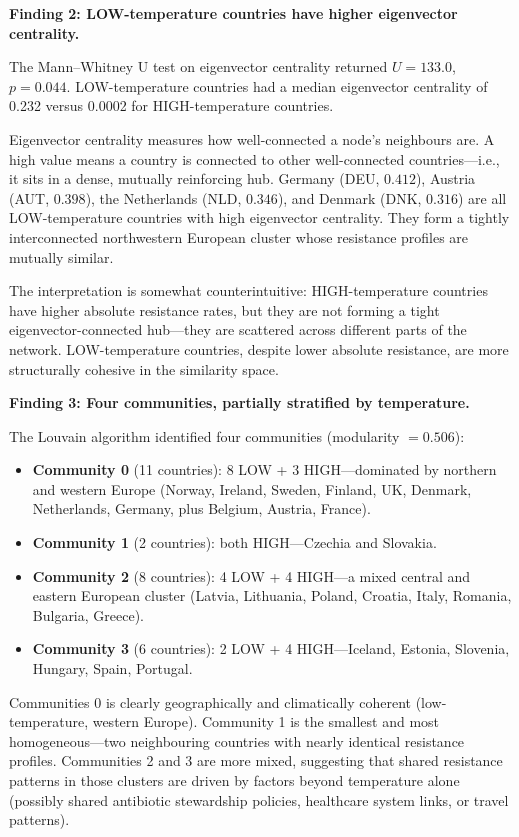 \documentclass[12pt,a4paper]{article}
\begin{document}
\textbf{Finding 2: LOW-temperature countries have higher eigenvector
centrality.}

The Mann--Whitney U test on eigenvector centrality returned
$U = 133.0$, $p = 0.044$.
LOW-temperature countries had a median eigenvector centrality of 0.232
versus 0.0002 for HIGH-temperature countries.

Eigenvector centrality measures how well-connected a node's neighbours
are.
A high value means a country is connected to other well-connected
countries---i.e., it sits in a dense, mutually reinforcing hub.
Germany (DEU, $0.412$), Austria (AUT, $0.398$), the Netherlands (NLD,
$0.346$), and Denmark (DNK, $0.316$) are all LOW-temperature countries
with high eigenvector centrality.
They form a tightly interconnected northwestern European cluster whose
resistance profiles are mutually similar.

The interpretation is somewhat counterintuitive: HIGH-temperature
countries have higher absolute resistance rates, but they are not
forming a tight eigenvector-connected hub---they are scattered across
different parts of the network.
LOW-temperature countries, despite lower absolute resistance, are more
structurally cohesive in the similarity space.

\textbf{Finding 3: Four communities, partially stratified by temperature.}

The Louvain algorithm identified four communities (modularity $= 0.506$):

\begin{itemize}
  \item \textbf{Community 0} (11 countries): 8 LOW + 3 HIGH---dominated
    by northern and western Europe (Norway, Ireland, Sweden, Finland,
    UK, Denmark, Netherlands, Germany, plus Belgium, Austria, France).
  \item \textbf{Community 1} (2 countries): both HIGH---Czechia and
    Slovakia.
  \item \textbf{Community 2} (8 countries): 4 LOW + 4 HIGH---a mixed
    central and eastern European cluster (Latvia, Lithuania, Poland,
    Croatia, Italy, Romania, Bulgaria, Greece).
  \item \textbf{Community 3} (6 countries): 2 LOW + 4 HIGH---Iceland,
    Estonia, Slovenia, Hungary, Spain, Portugal.
\end{itemize}

Communities 0 is clearly geographically and climatically coherent
(low-temperature, western Europe).
Community 1 is the smallest and most homogeneous---two neighbouring
countries with nearly identical resistance profiles.
Communities 2 and 3 are more mixed, suggesting that shared resistance
patterns in those clusters are driven by factors beyond temperature
alone (possibly shared antibiotic stewardship policies, healthcare
system links, or travel patterns).
\end{document}
